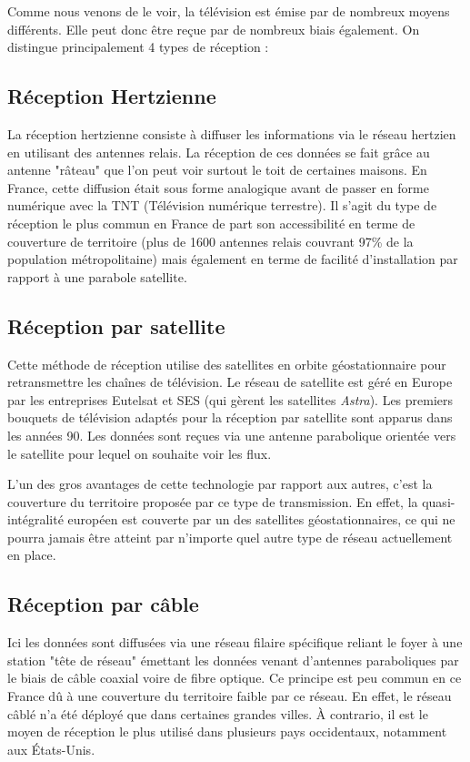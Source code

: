\documentclass{polytech/polytech}
\begin{document}
Comme nous venons de le voir, la télévision est émise par de nombreux moyens différents. Elle peut donc être reçue par de nombreux biais également. On distingue principalement 4 types de réception \cite{_comment_2018}:


\subsection{Réception Hertzienne}

La réception hertzienne consiste à diffuser les informations via le réseau hertzien en utilisant des antennes relais. La réception de ces données se fait grâce au antenne "râteau" que l'on peut voir surtout le toit de certaines maisons. En France, cette diffusion était sous forme analogique avant de passer en forme numérique avec la TNT (Télévision numérique terrestre). Il s'agit du type de réception le plus commun en France de part son accessibilité en terme de couverture de territoire (plus de 1600 antennes relais couvrant 97\% de la population métropolitaine) mais également en terme de facilité d'installation par rapport à une parabole satellite.


\subsection{Réception par satellite}


Cette méthode de réception utilise des satellites en orbite géostationnaire pour retransmettre les chaînes de télévision. Le réseau de satellite est géré en Europe par les entreprises Eutelsat et SES (qui gèrent les satellites \textit{Astra}). Les premiers bouquets de télévision adaptés pour la réception par satellite sont apparus dans les années 90. Les données sont reçues via une antenne parabolique orientée vers le satellite pour lequel on souhaite voir les flux. 

L'un des gros avantages de cette technologie par rapport aux autres, c'est la couverture du territoire proposée par ce type de transmission. En effet, la quasi-intégralité européen est couverte par un des satellites géostationnaires, ce qui ne pourra jamais être atteint par n'importe quel autre type de réseau actuellement en place.


\subsection{Réception par câble}


Ici les données sont diffusées via une réseau filaire spécifique reliant le foyer à une station "tête de réseau" émettant les données venant d'antennes paraboliques par le biais de câble coaxial voire de fibre optique. Ce principe est peu commun en ce France dû à une couverture du territoire faible par ce réseau. En effet, le réseau câblé n'a été déployé que dans certaines grandes villes. À contrario, il est le moyen de réception le plus utilisé dans plusieurs pays occidentaux, notamment aux \'{E}tats-Unis.
\end{document}
